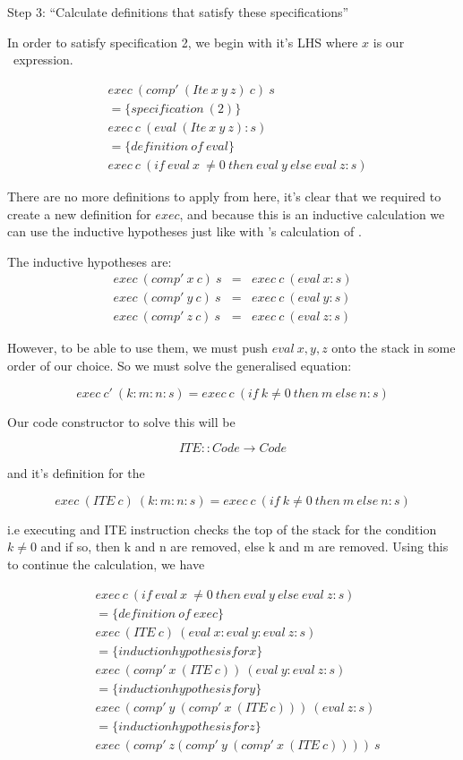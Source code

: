 \documentclass {article}
\begin{document}
Step 3: ``Calculate definitions that 
		satisfy these specifications''

In order to satisfy specification 2,
we begin with it's LHS where $x$ is our
\ite\ expression.

\begin{align*}
	&exec \ (comp' \ (Ite \ x \ y \ z) \ c) \ s \\
	&= \{specification \ (2) \} \\
	&exec \ c \ (eval \ (Ite \ x \ y \ z) : s) \\
	&= \{definition \ of \ eval\} \\
	&exec \ c \ (if \ eval \ x \ \not= 0 \ then \ eval \ y \ else \ eval \ z :s)
\end{align*}

There are no more definitions to apply from here,
it's clear that we required to
create a new definition for $exec$,
and because this is an inductive calculation
we can use the inductive hypotheses
just like with \BH's calculation of \add.

The inductive hypotheses are:
\begin{eqnarray*}
	exec \ (comp' \ x \ c) \ s &=& exec \ c \ (eval \ x:s) \\
	exec \ (comp' \ y \ c) \ s &=& exec \ c \ (eval \ y:s) \\
	exec \ (comp' \ z \ c) \ s &=& exec \ c \ (eval \ z:s)
\end{eqnarray*}

However, to be able to use them,
we must push $eval \ x,y,z$ onto the stack
in some order of our choice.
So we must solve the generalised equation:

	\[ exec \ c' \ (k:m:n:s) 
		= exec \ c \ (if \ k \not= 0 \ then \ m \ else \ n:s)\]

Our code constructor to solve this will be

	\[ ITE :: Code \rightarrow Code \]

and it's definition for the \vm

	\[ exec \ (ITE \ c) \ (k:m:n:s) 
		= exec \ c \ (if \ k \not= 0 \ then \ m \ else \ n:s) \]

i.e executing and ITE instruction
checks the top of the stack for the condition $k \not= 0$
and if so, then k and n are removed,
else k and m are removed.
Using this to continue the calculation, we have

\begin{align*}
	&exec \ c \ (if \ eval \ x \ \not= 0 \ then \ eval \ y \ else \ eval \ z :s) \\
	&= \{definition \ of \ exec\} \\
	&exec \ (ITE \ c) \ (eval \ x:eval \ y:eval \ z:s) \\
	&= \{induction hypothesis for x\} \\
	&exec \ (comp' \ x \ (ITE \ c)) \ (eval \ y:eval \ z:s) \\
	&= \{induction hypothesis for y\} \\
	&exec \ (comp' \ y \ (comp' \ x \ (ITE \ c))) \ (eval \ z:s) \\
	&= \{induction hypothesis for z\} \\
	&exec \ (comp' \ z (comp' \ y \ (comp' \ x \ (ITE \ c)))) \ s
\end{align*}
\end{document}
